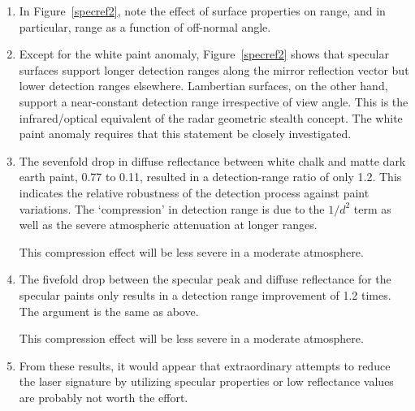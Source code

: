 \begin{enumerate}[1.]

\item
In Figure~\ref{specref2}, note the effect of surface properties on range, and in particular, range as a function of off-normal angle.
%
%

\item
Except for the white paint anomaly, Figure~\ref{specref2} shows that specular surfaces support longer detection ranges along the mirror reflection vector but lower detection ranges elsewhere. Lambertian surfaces, on the other hand, support a near-constant detection range irrespective of view angle. This is the infrared/optical equivalent of the radar geometric stealth concept. The white paint anomaly requires that this statement be closely investigated.

\item
The sevenfold drop in diffuse reflectance between white chalk and matte dark earth paint, 0.77 to 0.11, resulted in a detection-range ratio of only 1.2. This indicates the relative robustness of the detection process against paint variations. The `compression' in detection range is due to the $1/d^2$ term as well as the severe atmospheric attenuation at longer ranges.

This compression effect will be less severe in a moderate atmosphere.

\item
The fivefold drop between the specular peak and diffuse reflectance for the specular paints only results in a detection range improvement of 1.2 times. The argument is the same as  above.

This compression effect will be less severe in a moderate atmosphere.


\item 
From these results, it would appear that extraordinary attempts to reduce the laser signature by utilizing specular properties or low reflectance values are probably not worth the effort.



\end{enumerate}



